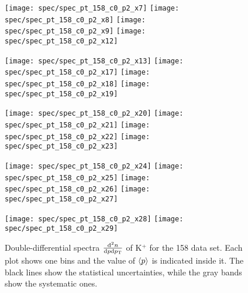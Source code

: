 \begin{figure}[!ht]
  \centering

  \texttt{[image: spec/spec\_pt\_158\_c0\_p2\_x7]}
  \texttt{[image: spec/spec\_pt\_158\_c0\_p2\_x8]}
  \texttt{[image: spec/spec\_pt\_158\_c0\_p2\_x9]}
  \texttt{[image: spec/spec\_pt\_158\_c0\_p2\_x12]}

  \texttt{[image: spec/spec\_pt\_158\_c0\_p2\_x13]}
  \texttt{[image: spec/spec\_pt\_158\_c0\_p2\_x17]}
  \texttt{[image: spec/spec\_pt\_158\_c0\_p2\_x18]}
  \texttt{[image: spec/spec\_pt\_158\_c0\_p2\_x19]}

  \texttt{[image: spec/spec\_pt\_158\_c0\_p2\_x20]}
  \texttt{[image: spec/spec\_pt\_158\_c0\_p2\_x21]}
  \texttt{[image: spec/spec\_pt\_158\_c0\_p2\_x22]}
  \texttt{[image: spec/spec\_pt\_158\_c0\_p2\_x23]}

  \texttt{[image: spec/spec\_pt\_158\_c0\_p2\_x24]}
  \texttt{[image: spec/spec\_pt\_158\_c0\_p2\_x25]}
  \texttt{[image: spec/spec\_pt\_158\_c0\_p2\_x26]}
  \texttt{[image: spec/spec\_pt\_158\_c0\_p2\_x27]}

  \texttt{[image: spec/spec\_pt\_158\_c0\_p2\_x28]}
  \texttt{[image: spec/spec\_pt\_158\_c0\_p2\_x29]}

  \caption{Double-differential spectra $\frac{\text{d}^2n}{\text{d}p\text{d}p_\text{T}}$
    of K$^+$ for the 158 \GeVc data set. Each plot shows one \pp bins and the value
    of $\langle p\rangle$ is indicated inside it. The black lines show the statistical
    uncertainties, while the gray bands show the systematic ones.}
  \label{fig:hadron:spec:dedx:all158:c0p2}
\end{figure}

